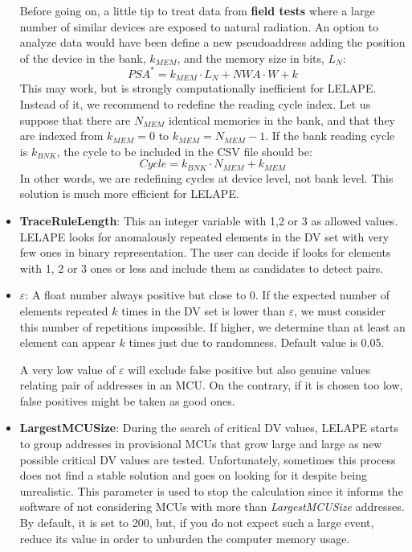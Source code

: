 \begin{itemize}
	Before going on, a little tip to treat data from\textbf{ field tests} where a large number of similar devices are exposed to natural radiation. An option to analyze data would have been define a new pseudoaddress adding the position of the device in the bank, \(k_{MEM}\), and the memory size in bits, \(L_N\):
	\[
		PSA^* = k_{MEM}\cdot L_N + NWA \cdot W + k
	\]
	This may work, but is strongly computationally inefficient for LELAPE. Instead of it, we recommend to redefine the reading cycle index. Let us suppose that there are \(N_{MEM}\) identical memories in the bank, and that they are indexed from \(k_{MEM}=0\) to \(k_{MEM}=N_{MEM}-1\). If the bank reading cycle is \(k_{BNK}\), the cycle to be included in the CSV file should be:
	\begin{equation}
		Cycle = k_{BNK}\cdot N_{MEM}+k_{MEM}
	\end{equation}
	In other words, we are redefining cycles at device level, not bank level. This solution is much more efficient for LELAPE.
	\item \textbf{TraceRuleLength}: This an integer variable with 1,2 or 3 as allowed values. LELAPE looks for anomalously repeated elements in the DV set with very few ones in binary representation. The user can decide if looks for elements with 1, 2 or 3 ones or less and include them as candidates to detect pairs. 
	\item \textbf{$\varepsilon$}: A float number always positive but close to 0. If the expected number of elements repeated $k$ times in the DV set is lower than $\varepsilon$, we must consider this number of repetitions impossible. If higher, we determine than at least an element can appear $k$ times just due to randomness. Default value is 0.05.
	
	A very low value of $\varepsilon$ will exclude false positive but also genuine values relating pair of addresses in an MCU. On the contrary, if it is chosen too low, false positives might be taken as good ones.
	\item \textbf{LargestMCUSize}: During the search of critical DV values, LELAPE starts to group addresses in provisional MCUs that grow large and large as new possible critical DV values are tested. Unfortunately, sometimes this process does not find a stable solution and goes on looking for it despite being unrealistic. This parameter is used to stop the calculation since it informs the software of not considering MCUs with more than \textit{LargestMCUSize} addresses. By default, it is set to 200, but, if you do not expect such a large event, reduce its value in order to unburden the computer memory usage. 
\end{itemize}

